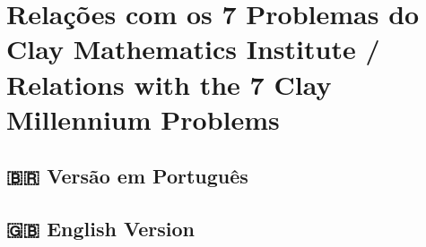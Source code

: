 \section{Relações com os 7 Problemas do Clay Mathematics Institute / Relations with the 7 Clay Millennium Problems}

\subsection*{🇧🇷 Versão em Português}

\subsection*{🇬🇧 English Version}
